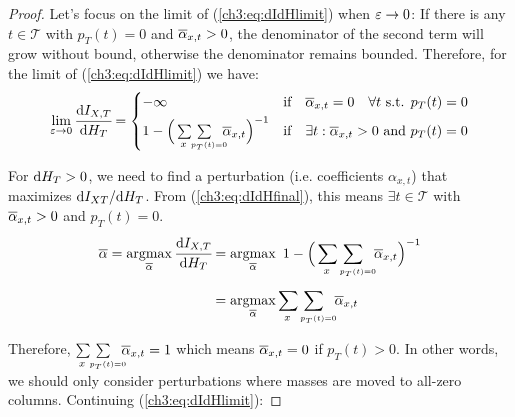 \begin{proof}
Let's focus on the limit of (\ref{ch3:eq:dIdHlimit}) when $\varepsilon\to 0$: If there is any $t\in\mathcal{T}$ with $p_T(t)=0$ and \mbox{$\overline{\alpha}_{x, t}>0$}, the denominator of the second term will grow without bound, otherwise the denominator remains bounded.  Therefore, for the limit of  (\ref{ch3:eq:dIdHlimit})  we have:
\begin{equation}
    \limdp \cfrac{\dif{I_{X,T}}}{\dif{H_T}} 
    =\begin{cases}
        -\infty & \text{if} \hspace{10pt} \abar_{x,t} = 0 \hspace{10pt} \forall t \text{ s.t. }  p_T(t)=0 \\[3pt]
        1-\Big(\doublesum{x}{\ \ p_T(t)=0}\ \abar_{x, t} \Big)^{-1} & \text{if} \hspace{10pt} \exists t: \abar_{x,t}>0 \text{ and } p_T(t)=0 
    \end{cases} \label{ch3:eq:dIdHfinal}
\end{equation}

For $ \text{d}{H_T}>0 $, we need to find a perturbation (i.e. coefficients $ \alpha_{x,t} $) that maximizes $ \text{d}{I_{XT}} / \text{d}{H_T} $. From (\ref{ch3:eq:dIdHfinal}), this means $\exists t\in\mathcal{T}$ with $\overline{\alpha}_{x,t}>0$ and $p_T(t)=0$.
\begin{align*}
    \abar 
    = \argmax_{\abar} \cfrac{\dif{I_{X,T}}}{\dif{H_T}}
    &= \argmax_{\abar} \ 1-\Big(\doublesum{x}{\ \ p_T(t)=0}\ \abar_{x, t} \Big)^{-1} \\[5pt]
    &= \argmax_{\abar} \doublesum{x}{\ \ p_T(t)=0}\ \abar_{x, t} 
\end{align*}

Therefore, $\doublesum{x}{\ \ p_T(t)=0}\ \abar_{x, t}=1$ which means $\overline{\alpha}_{x, t}=0$ if $p_T(t)>0$. In other words, we should only consider perturbations where masses are moved to all-zero columns. Continuing (\ref{ch3:eq:dIdHlimit}):


\end{proof}
